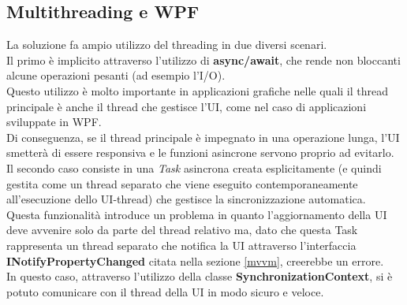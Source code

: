 \documentclass[\main/tesi.tex]{subfiles}
\begin{document}
\subsection{Multithreading e WPF}
La soluzione fa ampio utilizzo del threading in due diversi scenari.\\
Il primo è implicito attraverso l'utilizzo di \textbf{async/await}, che rende non bloccanti alcune operazioni pesanti (ad esempio l'I/O).\\
Questo utilizzo è molto importante in applicazioni grafiche nelle quali il thread principale è anche il thread che gestisce l'UI, come nel caso di applicazioni sviluppate in WPF.\\
Di conseguenza, se il thread principale è impegnato in una operazione lunga, l'UI smetterà di essere responsiva e le funzioni asincrone servono proprio ad evitarlo.\\

Il secondo caso consiste in una \textit{Task} asincrona creata esplicitamente (e quindi gestita come un thread separato che viene eseguito contemporaneamente all'esecuzione dello UI-thread) che gestisce la sincronizzazione automatica.\\
Questa funzionalità introduce un problema in quanto l'aggiornamento della UI deve avvenire solo da parte del thread relativo ma, dato che questa Task rappresenta un thread separato che notifica la UI attraverso l'interfaccia \textbf{INotifyPropertyChanged} citata nella sezione \ref{mvvm}, creerebbe un errore.\\
In questo caso, attraverso l'utilizzo della classe \textbf{SynchronizationContext}, si è potuto comunicare con il thread della UI in modo sicuro e veloce.
\end{document}
